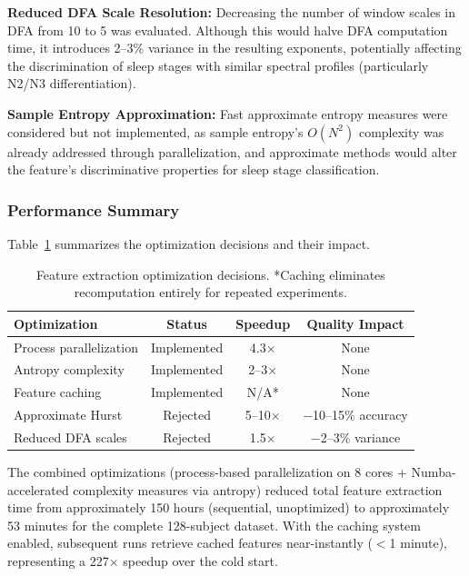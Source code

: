 \documentclass{imc-inf} %
\begin{document}
\textbf{Reduced DFA Scale Resolution:} Decreasing the number of window scales in DFA from 10 to 5 was evaluated. Although this would halve DFA computation time, it introduces 2--3\% variance in the resulting exponents, potentially affecting the discrimination of sleep stages with similar spectral profiles (particularly N2/N3 differentiation).

\textbf{Sample Entropy Approximation:} Fast approximate entropy measures were considered but not implemented, as sample entropy's $O(N^2)$ complexity was already addressed through parallelization, and approximate methods would alter the feature's discriminative properties for sleep stage classification.

\subsubsection{Performance Summary}

Table~\ref{tab:optimization_summary} summarizes the optimization decisions and their impact.

\begin{table}[ht]
\centering
\begin{tabular}{|l|c|c|c|}
\hline
\textbf{Optimization} & \textbf{Status} & \textbf{Speedup} & \textbf{Quality Impact} \\
\hline
Process parallelization & Implemented & 4.3$\times$ & None \\
\hline
Antropy complexity & Implemented & 2--3$\times$ & None \\
\hline
Feature caching & Implemented & N/A* & None \\
\hline
Approximate Hurst & Rejected & 5--10$\times$ & $-$10--15\% accuracy \\
\hline
Reduced DFA scales & Rejected & 1.5$\times$ & $-$2--3\% variance \\
\hline
\end{tabular}
\caption{Feature extraction optimization decisions. *Caching eliminates recomputation entirely for repeated experiments.}
\label{tab:optimization_summary}
\end{table}

The combined optimizations (process-based parallelization on 8 cores + Numba-accelerated complexity measures via antropy) reduced total feature extraction time from approximately 150 hours (sequential, unoptimized) to approximately 53 minutes for the complete 128-subject dataset. With the caching system enabled, subsequent runs retrieve cached features near-instantly ($<$1 minute), representing a 227$\times$ speedup over the cold start.
\end{document}
